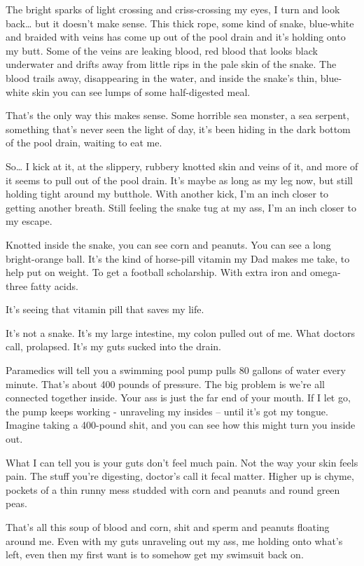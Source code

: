 \documentclass[10pt,a5paper,twoside]{book}
\begin{document}
The bright sparks of light crossing and criss-crossing my eyes, I turn and look back… but it doesn't make sense. This thick rope, some kind of snake, blue-white and braided with veins has come up out of the pool drain and it's holding onto my butt. Some of the veins are leaking blood, red blood that looks black underwater and drifts away from little rips in the pale skin of the snake. The blood trails away, disappearing in the water, and inside the snake's thin, blue-white skin you can see lumps of some half-digested meal.

That's the only way this makes sense. Some horrible sea monster, a sea serpent, something that's never seen the light of day, it's been hiding in the dark bottom of the pool drain, waiting to eat me.

So… I kick at it, at the slippery, rubbery knotted skin and veins of it, and more of it seems to pull out of the pool drain. It's maybe as long as my leg now, but still holding tight around my butthole. With another kick, I'm an inch closer to getting another breath. Still feeling the snake tug at my ass, I'm an inch closer to my escape.

Knotted inside the snake, you can see corn and peanuts. You can see a long bright-orange ball. It's the kind of horse-pill vitamin my Dad makes me take, to help put on weight. To get a football scholarship. With extra iron and omega-three fatty acids.

It's seeing that vitamin pill that saves my life.

It's not a snake. It's my large intestine, my colon pulled out of me. What doctors call, prolapsed. It's my guts sucked into the drain.

Paramedics will tell you a swimming pool pump pulls 80 gallons of water every minute. That's about 400 pounds of pressure. The big problem is we're all connected together inside. Your ass is just the far end of your mouth. If I let go, the pump keeps working - unraveling my insides -- until it's got my tongue. Imagine taking a 400-pound shit, and you can see how this might turn you inside out.

What I can tell you is your guts don't feel much pain. Not the way your skin feels pain. The stuff you're digesting, doctor's call it fecal matter. Higher up is chyme, pockets of a thin runny mess studded with corn and peanuts and round green peas.

That's all this soup of blood and corn, shit and sperm and peanuts floating around me. Even with my guts unraveling out my ass, me holding onto what's left, even then my first want is to somehow get my swimsuit back on.
\end{document}
